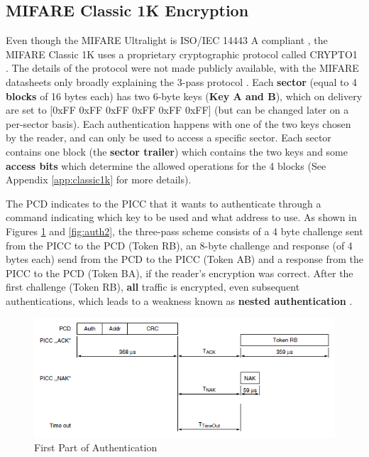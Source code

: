 \documentclass[fleqn,10pt]{SelfArx} %
\begin{document}
\subsection{MIFARE Classic 1K Encryption}

Even though the MIFARE Ultralight is ISO/IEC 14443 A compliant \cite{ultralight}, the MIFARE Classic 1K uses a proprietary cryptographic protocol called CRYPTO1 \cite{classic1k}. The details of the protocol were not made publicly available, with the MIFARE datasheets only broadly explaining the 3-pass protocol \cite{classic1k}. Each {\bf sector} (equal to 4 {\bf blocks} of 16 bytes each) has two 6-byte keys ({\bf Key A and B}), which on delivery are set to [0xFF 0xFF 0xFF 0xFF 0xFF 0xFF] (but can be changed later on a per-sector basis). Each authentication happens with one of the two keys chosen by the reader, and can only be used to access a specific sector. Each sector contains one block (the {\bf sector trailer}) which contains the two keys and some {\bf access bits} which determine the allowed operations for the 4 blocks (See Appendix \ref{app:classic1k} for more details).


The PCD indicates to the PICC that it wants to authenticate through a command indicating which key to be used and what address to use. As shown in Figures \ref{fig:auth1} and \ref{fig:auth2}, the three-pass scheme consists of a 4 byte challenge sent from the PICC to the PCD  (Token RB), an 8-byte challenge and response (of 4 bytes each) send from the PCD to the PICC (Token AB) and a response from the PICC to the PCD (Token BA), if the reader's encryption was correct. After the first challenge (Token RB), {\bf all} traffic is encrypted, even subsequent authentications, which leads to a weakness known as {\bf nested authentication} \cite{classicvulnerabilities}.

\begin{figure}[h]
  \includegraphics[width=\linewidth]{img/auth1.png}
  \caption{First Part of Authentication \cite{classic1k}}
  \label{fig:auth1}
\end{figure}
\end{document}
